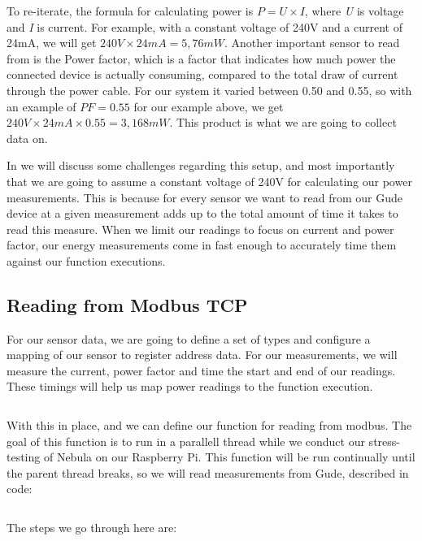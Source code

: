 \documentclass[
  table]{report}
\begin{document}
To re-iterate, the formula for calculating power is \(P = U \times I\),
where \emph{U} is voltage and \emph{I} is current. For example, with a
constant voltage of 240V and a current of 24mA, we will get
\(240V \times 24mA = 5,76mW\). Another important sensor to read from is
the Power factor, which is a factor that indicates how much power the
connected device is actually consuming, compared to the total draw of
current through the power cable. For our system it varied between 0.50
and 0.55, so with an example of \(PF = 0.55\) for our example above, we
get \(240V \times 24mA \times 0.55 = 3,168mW\). This product is what we
are going to collect data on.

In  we will discuss some challenges
regarding this setup, and most importantly that we are going to assume a
constant voltage of 240V for calculating our power measurements. This is
because for every sensor we want to read from our Gude device at a given
measurement adds up to the total amount of time it takes to read this
measure. When we limit our readings to focus on current and power
factor, our energy measurements come in fast enough to accurately time
them against our function executions.

\subsection{Reading from Modbus TCP}
\label{sect:read_modbus}

For our sensor data, we are going to define a set of types and configure
a mapping of our sensor to register address data. For our measurements,
we will measure the current, power factor and time the start and end of
our readings. These timings will help us map power readings to the
function execution.

\inputminted[firstline = 33, lastline = 60]{rust}{assets/code/modbus.rs}

With this in place, and we can define our function for reading from
modbus. The goal of this function is to run in a parallell thread while
we conduct our stress-testing of Nebula on our Raspberry Pi. This
function will be run continually until the parent thread breaks, so we
will read measurements from Gude, described in code:

\inputminted[firstline = 0, lastline = 31]{rust}{assets/code/modbus.rs}

The steps we go through here are:
\end{document}
